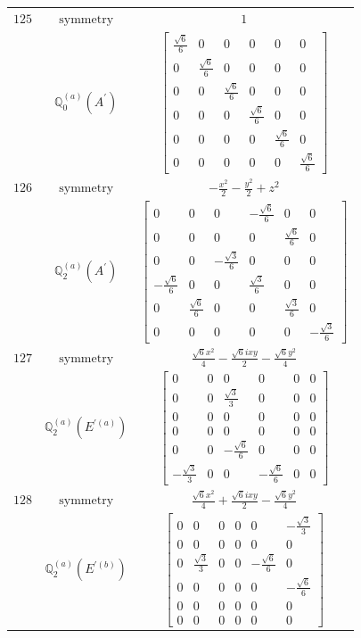 \documentclass[fleqn,8pt,landscape]{jsarticle}
\begin{document}
\begin{longtable}{ccc}
$ 125 $ & $ \text{symmetry} $ & $ 1 $ \\
$  $ & $ \mathbb{Q}_{0}^{(a)}(A^{\prime}) $ & $ \begin{bmatrix} \frac{\sqrt{6}}{6} & 0 & 0 & 0 & 0 & 0 \\ 0 & \frac{\sqrt{6}}{6} & 0 & 0 & 0 & 0 \\ 0 & 0 & \frac{\sqrt{6}}{6} & 0 & 0 & 0 \\ 0 & 0 & 0 & \frac{\sqrt{6}}{6} & 0 & 0 \\ 0 & 0 & 0 & 0 & \frac{\sqrt{6}}{6} & 0 \\ 0 & 0 & 0 & 0 & 0 & \frac{\sqrt{6}}{6} \end{bmatrix} $ \\ \hline
$ 126 $ & $ \text{symmetry} $ & $ - \frac{x^{2}}{2} - \frac{y^{2}}{2} + z^{2} $ \\
$  $ & $ \mathbb{Q}_{2}^{(a)}(A^{\prime}) $ & $ \begin{bmatrix} 0 & 0 & 0 & - \frac{\sqrt{6}}{6} & 0 & 0 \\ 0 & 0 & 0 & 0 & \frac{\sqrt{6}}{6} & 0 \\ 0 & 0 & - \frac{\sqrt{3}}{6} & 0 & 0 & 0 \\ - \frac{\sqrt{6}}{6} & 0 & 0 & \frac{\sqrt{3}}{6} & 0 & 0 \\ 0 & \frac{\sqrt{6}}{6} & 0 & 0 & \frac{\sqrt{3}}{6} & 0 \\ 0 & 0 & 0 & 0 & 0 & - \frac{\sqrt{3}}{6} \end{bmatrix} $ \\ \hline
$ 127 $ & $ \text{symmetry} $ & $ \frac{\sqrt{6} x^{2}}{4} - \frac{\sqrt{6} i x y}{2} - \frac{\sqrt{6} y^{2}}{4} $ \\
$  $ & $ \mathbb{Q}_{2}^{(a)}(E^{\prime(a)}) $ & $ \begin{bmatrix} 0 & 0 & 0 & 0 & 0 & 0 \\ 0 & 0 & \frac{\sqrt{3}}{3} & 0 & 0 & 0 \\ 0 & 0 & 0 & 0 & 0 & 0 \\ 0 & 0 & 0 & 0 & 0 & 0 \\ 0 & 0 & - \frac{\sqrt{6}}{6} & 0 & 0 & 0 \\ - \frac{\sqrt{3}}{3} & 0 & 0 & - \frac{\sqrt{6}}{6} & 0 & 0 \end{bmatrix} $ \\ \hline
$ 128 $ & $ \text{symmetry} $ & $ \frac{\sqrt{6} x^{2}}{4} + \frac{\sqrt{6} i x y}{2} - \frac{\sqrt{6} y^{2}}{4} $ \\
$  $ & $ \mathbb{Q}_{2}^{(a)}(E^{\prime(b)}) $ & $ \begin{bmatrix} 0 & 0 & 0 & 0 & 0 & - \frac{\sqrt{3}}{3} \\ 0 & 0 & 0 & 0 & 0 & 0 \\ 0 & \frac{\sqrt{3}}{3} & 0 & 0 & - \frac{\sqrt{6}}{6} & 0 \\ 0 & 0 & 0 & 0 & 0 & - \frac{\sqrt{6}}{6} \\ 0 & 0 & 0 & 0 & 0 & 0 \\ 0 & 0 & 0 & 0 & 0 & 0 \end{bmatrix} $ \\ \hline

\end{longtable}
\end{document}
